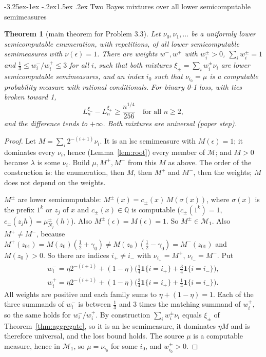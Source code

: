 \documentclass[11pt]{article}
\makeatletter
\renewcommand\subsection{\@startsection{subsection}{2}{\z@}%
  {-3.25ex\@plus -1ex \@minus -.2ex}{1.5ex \@plus .2ex}%
  {\normalfont\large\bfseries\boldmath}}
\newcommand{\eps}{\epsilon}
\newcommand{\cM}{\mathcal{M}}
\newcommand{\cMone}{\mathcal{M}_1}
\newcommand{\ind}{\mathbf{1}}
\newtheorem{theorem}{Theorem}[section]
\theoremstyle{definition}
\theoremstyle{remark}
\makeatother
\begin{document}
\subsection{Two Bayes mixtures over all lower semicomputable semimeasures}

\begin{theorem}[main theorem for Problem 3.3]\label{thm:mixture}
Let $\nu_0,\nu_1,\dots$ be a uniformly lower semicomputable enumeration, with
repetitions, of all lower semicomputable semimeasures with $\nu(\eps)=1$.
There are weights $w^-,w^+$ with $w^\pm_i>0$, $\sum_iw^\pm_i=1$ and
$\frac13\le w^-_i/w^+_i\le3$ for all $i$, such that both mixtures
$\xi_\pm=\sum_iw^\pm_i\nu_i$ are lower semicomputable semimeasures, and an
index $i_0$ such that $\nu_{i_0}=\mu$ is a computable probability measure with
rational conditionals. For binary 0-1 loss, with ties broken toward 1,
\[
L_n^{\xi_-}-L_n^{\xi_+}\ge\frac{n^{1/4}}{256}\quad\text{for all }n\ge2,
\]
and the difference tends to $+\infty$. Both mixtures are universal (paper step).
\end{theorem}

\begin{proof}
Let $M=\sum_i2^{-(i+1)}\nu_i$. It is an lsc semimeasure with $M(\eps)=1$; it
dominates every $\nu_i$, hence (Lemma~\ref{lem:root}) every member of $\cM$;
and $M>0$ because $\lambda$ is some $\nu_i$. Build $\mu,M^+,M^-$ from this $M$ as
above. The order of the construction is: the enumeration, then $M$, then $M^+$
and $M^-$, then the weights; $M$ does not depend on the weights.

$M^\pm$ are lower semicomputable: $M^\pm(x)=c_\pm(x)\,M(\sigma(x))$, where
$\sigma(x)$ is the prefix $1^k$ or $z_j$ of $x$ and $c_\pm(x)\in\mathbb Q$ is
computable ($c_\pm(1^k)=1$, $c_\pm(z_jh)=\mu^\pm_{N_j}(h)$). Also $M^\pm(\eps)=M(\eps)=1$.
So $M^\pm\in\cMone$. Also $M^+\neq M^-$, because
$M^+(z_01)=M(z_0)(\frac12+\gamma_0)\neq M(z_0)(\frac12-\gamma_0)=M^-(z_01)$ and
$M(z_0)>0$. So there are indices $i_+\neq i_-$ with $\nu_{i_+}=M^+$, $\nu_{i_-}=M^-$.
Put
\begin{gather*}
w^-_i=\eta2^{-(i+1)}+(1-\eta)\bigl(\tfrac14\ind\{i=i_+\}+\tfrac34\ind\{i=i_-\}\bigr),\\
w^+_i=\eta2^{-(i+1)}+(1-\eta)\bigl(\tfrac34\ind\{i=i_+\}+\tfrac14\ind\{i=i_-\}\bigr).
\end{gather*}
All weights are positive and each family sums to $\eta+(1-\eta)=1$. Each of the
three summands of $w^-_i$ is between $\frac13$ and $3$ times the matching summand
of $w^+_i$, so the same holds for $w^-_i/w^+_i$. By construction
$\sum_iw^\pm_i\nu_i$ equals $\xi_\pm$ of Theorem~\ref{thm:aggregate}, so it is
an lsc semimeasure, it dominates $\eta M$ and is therefore universal, and the
loss bound holds. The source $\mu$ is a computable measure, hence in $\cMone$,
so $\mu=\nu_{i_0}$ for some $i_0$, and $w^\pm_{i_0}>0$.
\end{proof}
\end{document}
